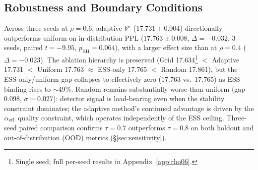 \subsection{Robustness and Boundary Conditions}
\label{sec:robustness}

Across three seeds at $\rho = 0.6$, adaptive $\bstar$ ($17.731 \pm 0.004$) directionally outperforms uniform on in-distribution PPL ($17.763 \pm 0.008$, $\Delta{=}{-}0.032$, 3 seeds, paired $t{=}{-}9.95$, $p_{\mathrm{BH}}{=}0.064$), with a larger effect size than at $\rho{=}0.4$ ($\Delta{=}{-}0.023$).
The ablation hierarchy is preserved (Grid 17.634\footnote{Single seed; full per-seed results in Appendix~\ref{app:rho06}.} ${<}$ Adaptive 17.731 ${<}$ Uniform 17.763 ${\approx}$ ESS-only 17.765 ${<}$ Random 17.861), but the ESS-only/uniform gap collapses to effectively zero ($17.763$ vs.\ $17.765$) as ESS binding rises to ${\sim}$49\%.
Random remains substantially worse than uniform (gap 0.098, $\sigma{=}0.027$): detector signal is load-bearing even when the stability constraint dominates; the adaptive method's continued advantage is driven by the $\alpha_{\mathrm{eff}}$ quality constraint, which operates independently of the ESS ceiling.
Three-seed paired comparison confirms $\tau{=}0.7$ outperforms $\tau{=}0.8$ on both holdout and out-of-distribution (OOD) metrics (\S\ref{sec:sensitivity}).

\begin{table}[t]
\centering
\small
\setlength{\tabcolsep}{3pt}
\caption{D\&R threshold comparison ($\rho{=}0.4$).
Raw PPL traces a U-shape across thresholds; epoch-matched PPL (single content epoch) decreases monotonically and saturates near the adaptive $\bstar$ level.
D\&R's 0.424 PPL advantage (at $q{>}0.3$) shrinks to $\Delta{=}0.017$ when content epochs are equalized.
All raw PPL values are 3-seed means; epoch-matched values at $q{>}0.3$ and $q{>}0.7$ are single-seed.
Full 9-threshold sweep in Table~\ref{tab:dr_threshold}.}
\label{tab:epoch_match}
\end{table}

